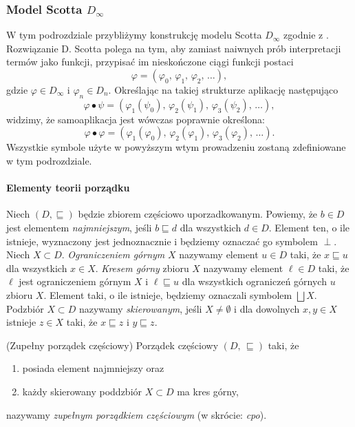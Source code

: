 \subsubsection{Model Scotta \(D_\infty\)}
W tym podrozdziale przybliżymy konstrukcję modelu Scotta \(D_\infty\) zgodnie z \cite[Rozdział 16]{Hindley:2008:LCI:1388400}. Rozwiązanie D. Scotta polega na tym, aby zamiast naiwnych prób interpretacji termów jako funkcji, przypisać im nieskończone ciągi funkcji postaci 
\[
  \varphi = (\varphi_0,\,\varphi_1,\,\varphi_2,\,\dots),
\]
gdzie \(\varphi \in D_\infty\) i \(\varphi_n\in D_n\). Określając na takiej strukturze aplikację następująco
\[
  \varphi\bullet\psi = (\varphi_1(\psi_0),\,\varphi_2(\psi_1),\,\varphi_3(\psi_2),\,\dots),
\]
widzimy, że samoaplikacja jest wówczas poprawnie określona: 
\[
  \varphi\bullet\varphi = (\varphi_1(\varphi_0),\,\varphi_2(\varphi_1),\,\varphi_3(\varphi_2),\,\dots).
\]
Wszystkie symbole użyte w powyższym wtym prowadzeniu zostaną zdefiniowane w tym podrozdziale.

\paragraph{Elementy teorii porządku} 
Niech \((D,\sqsubseteq)\) będzie zbiorem częściowo uporzadkowanym. Powiemy, że \(b\in D\) jest elementem \emph{najmniejszym}, jeśli \(b\sqsubseteq d\) dla wszystkich \(d\in D\). Element ten, o ile istnieje, wyznaczony jest jednoznacznie i będziemy oznaczać go symbolem \(\perp\). Niech \(X\subset D\). \emph{Ograniczeniem górnym} \(X\) nazywamy element \(u\in D\) taki, że \(x\sqsubseteq u\) dla wszystkich \(x\in X\). \emph{Kresem górny} zbioru \(X\) nazywamy element \(\ell\in D\) taki, że \(\ell\) jest ograniczeniem górnym \(X\) i \(\ell\sqsubseteq u\) dla wszystkich ograniczeń górnych \(u\) zbioru \(X\). Element taki, o ile istnieje, będziemy oznaczali symbolem \(\bigsqcup X\). Podzbiór \(X\subset D\) nazywamy \emph{skierowanym}, jeśli \(X\neq\emptyset\) i dla dowolnych \(x, y\in X\) istnieje \(z\in X\) taki, że \(x\sqsubseteq z\) i \(y\sqsubseteq z\). 

\begin{definicja}(Zupełny porządek częściowy) %
Porządek częściowy \((D,\,\sqsubseteq)\) taki, że
\begin{enumerate}[label={(\alph*)}, ref={(\alph*)}]
  \setlength\itemsep{0em}
  \item posiada element najmniejszy oraz
  \item każdy skierowany poddzbiór \(X\subset D\) ma kres górny,
\end{enumerate}
  nazywamy \emph{zupełnym porządkiem częściowym} (w skrócie: \emph{cpo}).
\end{definicja}

